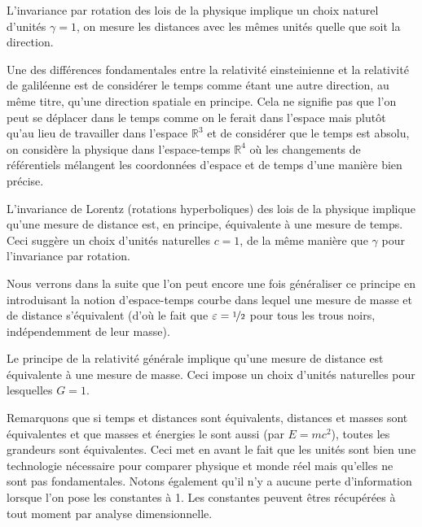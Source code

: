 \documentclass[a4paper,11pt]{report}
\theoremstyle{definition}
\theoremstyle{plain}
\theoremstyle{definition}
\theoremstyle{remark}
\begin{document}
        \begin{leftbar}
            L'invariance par rotation des lois de la physique implique un choix naturel d'unités $\gamma = 1$, on mesure les distances avec les mêmes unités quelle que soit la direction.
        \end{leftbar}
        
        Une des différences fondamentales entre la relativité einsteinienne et la relativité de galiléenne est de considérer le temps comme étant une autre direction, au même titre, qu'une direction spatiale en principe. Cela ne signifie pas que l'on peut se déplacer dans le temps comme on le ferait dans l'espace mais plutôt qu'au lieu de travailler dans l'espace $\mathbb{R}^3$ et de considérer que le temps est absolu, on considère la physique dans l'espace-temps $\mathbb{R}^4$ où les changements de référentiels mélangent les coordonnées d'espace et de temps d'une manière bien précise.
        
        \begin{leftbar}
            L'invariance de Lorentz (rotations hyperboliques) des lois de la physique implique qu'une mesure de distance est, en principe, équivalente à une mesure de temps. Ceci suggère un choix d'unités naturelles $c=1$, de la même manière que $\gamma$ pour l'invariance par rotation.
        \end{leftbar}
        
        Nous verrons dans la suite que l'on peut encore une fois généraliser ce principe en introduisant la notion d'espace-temps courbe dans lequel une mesure de masse et de distance s'équivalent (d'où le fait que $\varepsilon = \nicefrac{1}{2}$ pour tous les trous noirs, indépendemment de leur masse).
        
        \begin{leftbar}
            Le principe de la relativité générale implique qu'une mesure de distance est équivalente à une mesure de masse. Ceci impose un choix d'unités naturelles pour lesquelles $G = 1$.
        \end{leftbar}
        
        Remarquons que si temps et distances sont équivalents, distances et masses sont équivalentes et que masses et énergies le sont aussi (par $E = mc^2$), toutes les grandeurs sont équivalentes. Ceci met en avant le fait que les unités sont bien une technologie nécessaire pour comparer physique et monde réel mais qu'elles ne sont pas fondamentales. Notons également qu'il n'y a aucune perte d'information lorsque l'on pose les constantes à 1. Les constantes peuvent êtres récupérées à tout moment par analyse dimensionnelle.
\end{document}
